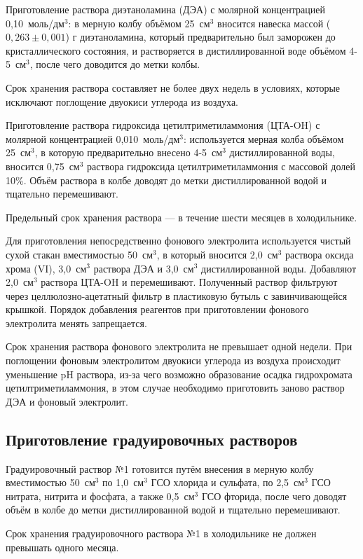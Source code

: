 Приготовление раствора диэтаноламина (ДЭА) с молярной концентрацией 0,10~моль/дм$^3$: в мерную колбу объёмом 25~см$^3$ вносится навеска массой ($0{,}263 \pm 0{,}001$) г диэтаноламина, который предварительно был заморожен до кристаллического состояния, и растворяется в дистиллированной воде объёмом 4-5~см$^3$, после чего доводится до метки колбы.

Срок хранения раствора составляет не более двух недель в условиях, которые исключают поглощение двуокиси углерода из воздуха.

Приготовление раствора гидроксида цетилтриметиламмония (ЦТА-OH) с молярной концентрацией 0,010~моль/дм$^3$: используется мерная колба объёмом 25~см$^3$, в которую предварительно внесено 4-5~см$^3$ дистиллированной воды, вносится 0,75~см$^3$ раствора гидроксида цетилтриметиламмония с массовой долей 10\%. Объём раствора в колбе доводят до метки дистиллированной водой и тщательно перемешивают.

Предельный срок хранения раствора — в течение шести месяцев в холодильнике.

Для приготовления непосредственно фонового электролита используется чистый сухой стакан вместимостью 50~см$^3$, в который вносится 2,0~см$^3$ раствора оксида хрома (VI), 3,0~см$^3$ раствора ДЭА и 3,0~см$^3$ дистиллированной воды. Добавляют 2,0~см$^3$ раствора ЦТА-OH и перемешивают. Полученный раствор фильтруют через целлюлозно-ацетатный фильтр в пластиковую бутыль с завинчивающейся крышкой. Порядок добавления реагентов при приготовлении фонового электролита менять запрещается.

Срок хранения раствора фонового электролита не превышает одной недели. При поглощении фоновым электролитом двуокиси углерода из воздуха происходит уменьшение pH раствора, из-за чего возможно образование осадка гидрохромата цетилтриметиламмония, в этом случае необходимо приготовить заново раствор ДЭА и фоновый электролит.

\subsection{Приготовление градуировочных растворов}

Градуировочный раствор №1 готовится путём внесения в мерную колбу вместимостью 50~см$^3$ по 1,0~см$^3$ ГСО хлорида и сульфата, по 2,5~см$^3$ ГСО нитрата, нитрита и фосфата, а также 0,5~см$^3$ ГСО фторида, после чего доводят объём в колбе до метки дистиллированной водой и тщательно перемешивают.

Срок хранения градуировочного раствора №1 в холодильнике не должен превышать одного месяца.

